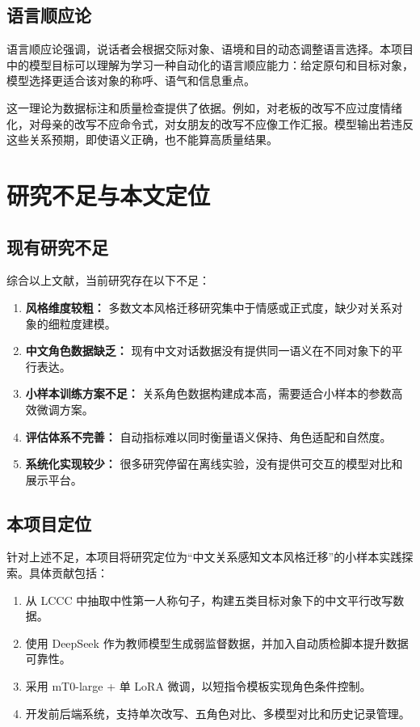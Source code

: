 \documentclass[12pt,a4paper]{ctexart}
\begin{document}
\subsection{语言顺应论}

语言顺应论强调，说话者会根据交际对象、语境和目的动态调整语言选择。本项目中的模型目标可以理解为学习一种自动化的语言顺应能力：给定原句和目标对象，模型选择更适合该对象的称呼、语气和信息重点。

这一理论为数据标注和质量检查提供了依据。例如，对老板的改写不应过度情绪化，对母亲的改写不应命令式，对女朋友的改写不应像工作汇报。模型输出若违反这些关系预期，即使语义正确，也不能算高质量结果。

\section{研究不足与本文定位}

\subsection{现有研究不足}

综合以上文献，当前研究存在以下不足：

\begin{enumerate}[leftmargin=2em]
  \item \textbf{风格维度较粗：} 多数文本风格迁移研究集中于情感或正式度，缺少对关系对象的细粒度建模。
  \item \textbf{中文角色数据缺乏：} 现有中文对话数据没有提供同一语义在不同对象下的平行表达。
  \item \textbf{小样本训练方案不足：} 关系角色数据构建成本高，需要适合小样本的参数高效微调方案。
  \item \textbf{评估体系不完善：} 自动指标难以同时衡量语义保持、角色适配和自然度。
  \item \textbf{系统化实现较少：} 很多研究停留在离线实验，没有提供可交互的模型对比和展示平台。
\end{enumerate}

\subsection{本项目定位}

针对上述不足，本项目将研究定位为“中文关系感知文本风格迁移”的小样本实践探索。具体贡献包括：

\begin{enumerate}[leftmargin=2em]
  \item 从 LCCC 中抽取中性第一人称句子，构建五类目标对象下的中文平行改写数据。
  \item 使用 DeepSeek 作为教师模型生成弱监督数据，并加入自动质检脚本提升数据可靠性。
  \item 采用 mT0-large + 单 LoRA 微调，以短指令模板实现角色条件控制。
  \item 开发前后端系统，支持单次改写、五角色对比、多模型对比和历史记录管理。
\end{enumerate}
\end{document}

